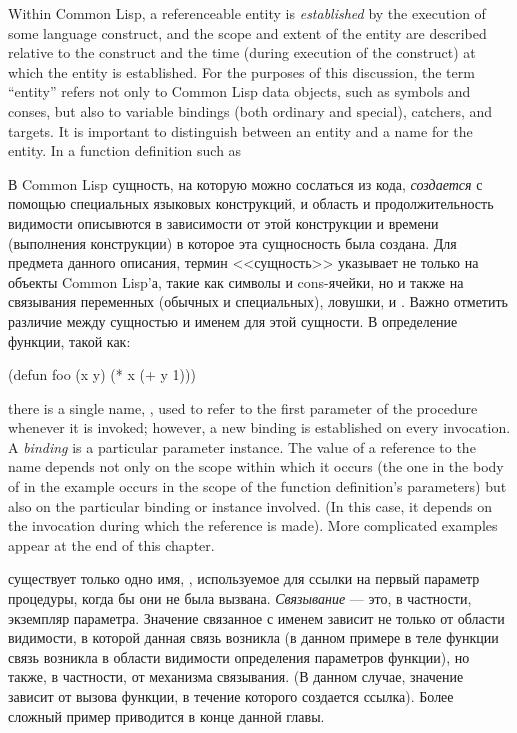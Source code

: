 Within Common Lisp, a referenceable entity is {\it established} by the execution
of some language construct, and the scope and extent of the entity are
described relative to the construct and the time (during execution of the
construct) at which the entity is established.
For the purposes of this discussion, the term ``entity'' refers not only
to Common Lisp data objects, such as symbols and conses, but also to
variable bindings (both ordinary and special), catchers,
and  targets.  It is important to distinguish between
an entity and a name for the entity.  In a function definition
such as

В Common Lisp сущность, на которую можно сослаться из кода, {\it создается} с
помощью специальных языковых конструкций, и область и продолжительность
видимости описывются в зависимости от этой конструкции и времени (выполнения
конструкции) в которое эта сущносность была создана.
Для предмета данного описания, термин <<сущность>> указывает не только на
объекты Common Lisp'а, такие как символы и cons-ячейки, но и также на связывания
переменных (обычных и специальных), ловушки, и . Важно
отметить различие между сущностью и именем для этой сущности. В определение
функции, такой как:

\begin{lisp}
(defun foo (x y) (* x (+ y 1)))
\end{lisp}

there is a single name, , used to refer to the first parameter
of the procedure whenever it is invoked; however, a new binding
is established on every invocation.  A {\it binding} is a particular
parameter instance.  The value of a reference to the name 
depends not only on the scope within which it occurs (the one in
the body of  in the example occurs in the scope of the
function definition's parameters) but also on the particular
binding or instance involved.  (In this case, it depends on the
invocation during which
the reference is made).  More complicated examples
appear at the end of this chapter.

существует только одно имя, , используемое для ссылки на первый параметр
процедуры, когда бы они не была вызвана. {\it Связывание} --- это, в частности,
экземпляр параметра. Значение связанное с именем  зависит не только от
области видимости, в которой данная связь возникла (в данном примере в теле
функции  связь возникла в области видимости определения параметров
функции), но также, в частности, от механизма связывания. (В данном случае,
значение зависит от вызова функции, в течение которого создается ссылка). Более
сложный пример приводится в конце данной главы. 

